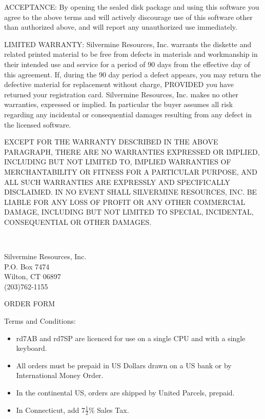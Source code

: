 ACCEPTANCE:  By opening the sealed disk package and using this
software you agree to the above terms and will actively discourage use
of this software other than authorized above, and will report any
unauthorized use immediately.

LIMITED WARRANTY:  Silvermine Resources, Inc. warrants the diskette
and related printed material to be free from defects in materials and
workmanship in their intended use and service for a period of 90 days
from the effective day of this agreement.  If, during the 90 day period
a defect appears, you may return the defective material for
replacement without charge, PROVIDED you have returned your
registration card.  Silvermine Resources, Inc. makes no other
warranties, expressed or implied.  In particular the buyer assumes
all risk regarding any incidental or consequential damages resulting
from any defect in the licensed software.  

\sloppypar
EXCEPT FOR THE WARRANTY DESCRIBED IN THE ABOVE PARAGRAPH, THERE ARE
NO WARRANTIES EXPRESSED OR IMPLIED, INCLUDING BUT NOT LIMITED TO,
IMPLIED WARRANTIES OF MERCHANT\-ABILITY OR FITNESS FOR A PAR\-TIC\-U\-LAR
PURPOSE, AND ALL SUCH WARRANTIES ARE EXPRESSLY AND SPECIFICALLY
DISCLAIMED.  IN NO EVENT SHALL SILVERMINE RESOURCES, INC. BE LIABLE
FOR ANY LOSS OF PROFIT OR ANY OTHER COMMERCIAL DAMAGE, INCLUDING BUT
NOT LIMITED TO SPECIAL, INCIDENTAL, CONSEQUENTIAL OR OTHER DAMAGES.

\bigskip
\noindent\ \hrulefill\ 
\bigskip
\begin{center}
	Silvermine Resources, Inc.	\\
	P.O. Box 7474			\\
	Wilton, CT 06897		\\
	(203)762-1155			\\
\end{center}
 
 
\newpage

\begin{center}
                               ORDER FORM
\end{center}

Terms and Conditions:
\begin{itemize}
\item 
  rd7AB and rd7SP are licenced for use on a single CPU and 
	with a single keyboard.

\item
 All orders must be prepaid in US Dollars drawn on a US bank
	or by International Money Order.

\item
 In the continental US, orders are shipped by United Parcels,
	prepaid. 

\item 
 In Connecticut, add $7\frac{1}{2}\%$ Sales Tax.
\end{itemize}

